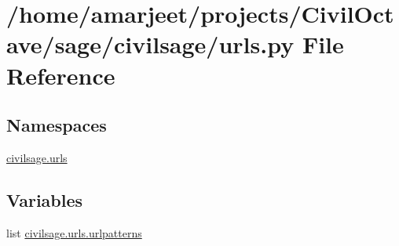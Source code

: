 \hypertarget{a00015}{}\section{/home/amarjeet/projects/\+Civil\+Octave/sage/civilsage/urls.py File Reference}
\label{a00015}
\subsection*{Namespaces}
\begin{DoxyCompactItemize}
\item 
 \hyperlink{a00035}{civilsage.\+urls}
\end{DoxyCompactItemize}
\subsection*{Variables}
\begin{DoxyCompactItemize}
\item 
list \hyperlink{a00035_a46a501661622e9e2b11c9d6da43bbec0}{civilsage.\+urls.\+urlpatterns}
\end{DoxyCompactItemize}
